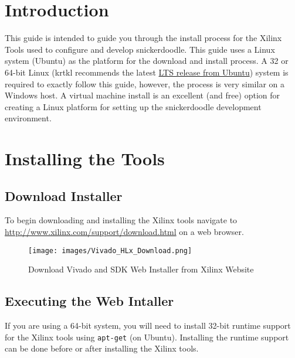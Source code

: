 \section{Introduction}

This guide is intended to guide you through the install process for the Xilinx Tools used to configure and develop snickerdoodle. This guide uses a Linux system (Ubuntu) as the platform for the download and install process. A 32 or 64-bit Linux (krtkl recommends the latest \href{http://www.ubuntu.com/download/desktop/}{LTS release from Ubuntu}) system is required to exactly follow this guide, however, the process is very similar on a Windows host. A virtual machine install is an excellent (and free) option for creating a Linux platform for setting up the snickerdoodle development environment. 


\section{Installing the Tools}

\subsection{Download Installer}



\noindent
To begin downloading and installing the Xilinx tools navigate to \url{http://www.xilinx.com/support/download.html} on a web browser. 

\begin{figure*}
	\centering
	\texttt{[image: images/Vivado\_HLx\_Download.png]}
	\caption{Download Vivado and SDK Web Installer from Xilinx Website}
\end{figure*}


\subsection{Executing the Web Intaller}
\noindent
If you are using a 64-bit system, you will need to install 32-bit runtime support for the Xilinx tools using \texttt{apt-get} (on Ubuntu). Installing the runtime support can be done before or after installing the Xilinx tools. \\

